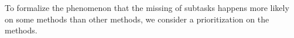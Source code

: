\documentclass[letterpaper]{article} %
\newtheorem{definition}{Definition}
\newcommand{\Operators}{\mathcal{O}}
\newcommand{\Cactions}{\mathcal{C}}
\newcommand{\Methods}{\mathcal{M}}
\newcommand{\HtnProblem}{\mathcal{P}}
\newcommand{\Lvar}{\mathcal{L}}
\newcommand{\tn}{\mathsf{tn}}
\newcommand{\prefer}{\leq_P}
\begin{document}

To formalize the phenomenon that the missing of subtasks happens more likely on some methods than other methods,
we consider a prioritization on the methods. %

%
\end{document}
